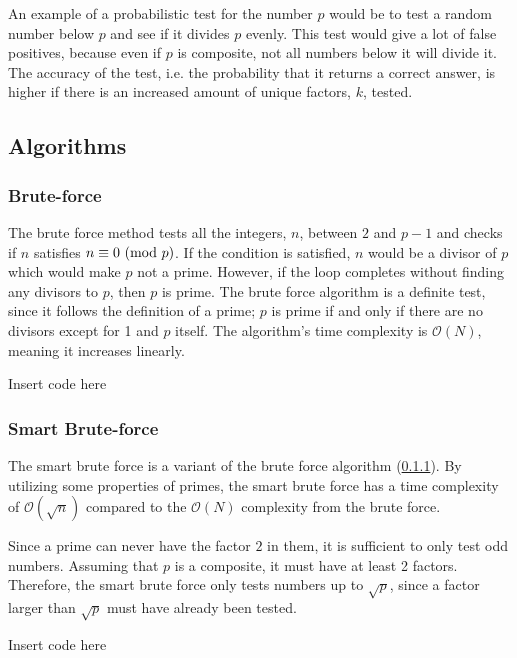 \documentclass[main.tex]{subfiles}
\begin{document}
An example of a probabilistic test for the number $p$ would be to test a random
number below $p$ and see if it divides $p$ evenly. This test would give a lot of
false positives, because even if $p$ is composite, not all numbers below it will
divide it. The accuracy of the test, i.e. the probability that it returns a
correct answer, is higher if there is an increased amount of unique factors,
$k$, tested.

\subsection{Algorithms}

\subsubsection{Brute-force} \label{brute} The brute force method tests all the
integers, $n$, between $2$ and $p-1$ and checks if $n$ satisfies $n \equiv 0
\ (\mathrm{mod}\ p)$. If the condition is satisfied, $n$ would be a divisor of $p$ which
would make $p$ not a prime. However, if the loop completes without finding any
divisors to $p$, then $p$ is prime. The brute force algorithm is a definite
test, since it follows the definition of a prime; $p$ is prime if and only if
there are no divisors except for 1 and $p$ itself. The algorithm's time
complexity is $\mathcal{O}(N)$, meaning it increases linearly. \newline

\begin{python}
  Insert code here
\end{python}

\subsubsection{Smart Brute-force}
The smart brute force is a variant of the brute force algorithm (\ref{brute}).
By utilizing some properties of primes, the smart brute force has a time
complexity of $\mathcal{O}(\sqrt{n})$ compared to the $\mathcal{O}(N)$ complexity from the brute
force.

Since a prime can never have the factor $2$ in them, it is sufficient to only
test odd numbers. Assuming that $p$ is a composite, it must have at least 2
factors. Therefore, the smart brute force only tests numbers up to $\sqrt{p}$,
since a factor larger than $\sqrt{p}$ must have already been tested. \newline

\begin{python}
  Insert code here
\end{python}
\end{document}

